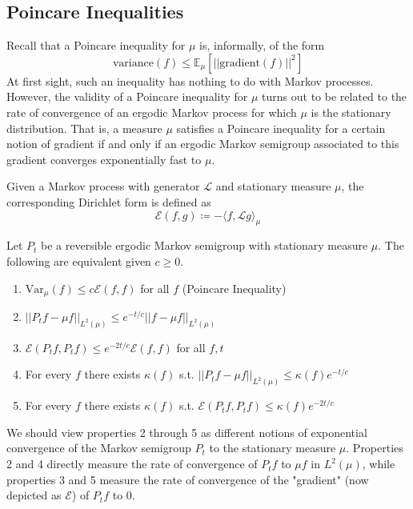 \documentclass{article}
\begin{document}
  \subsection{Poincare Inequalities}

  Recall that a Poincare inequality for $\mu$ is, informally, of the form 
  \[\mathrm{variance}(f) \leq \mathbb{E}_\mu[ ||\mathrm{gradient}(f)||^2 ]\]
  At first sight, such an inequality has nothing to do with Markov processes. However, the validity of a Poincare inequality for $\mu$ turns out to be related to the rate of convergence of an ergodic Markov process for which $\mu$ is the stationary distribution. That is, a measure $\mu$ satisfies a Poincare inequality for a certain notion of gradient if and only if an ergodic Markov semigroup associated to this gradient converges exponentially fast to $\mu$. 

  \begin{definition}
  Given a Markov process with generator $\mathscr{L}$ and stationary measure $\mu$, the corresponding Dirichlet form is defined as 
  \[\mathcal{E}(f, g) \coloneqq - \langle f, \mathscr{L} g \rangle_\mu\]
  \end{definition}

  \begin{theorem}
  Let $P_t$ be a reversible ergodic Markov semigroup with stationary measure $\mu$. The following are equivalent given $c \geq 0$. 
  \begin{enumerate}
      \item $\mathrm{Var}_\mu (f) \leq c \mathcal{E}(f, f)$ for all $f$ (Poincare Inequality) 
      \item $||P_t f - \mu f||_{L^2 (\mu)} \leq e^{-t /c} ||f - \mu f||_{L^2 (\mu)}$
      \item $\mathcal{E}(P_t f, P_t f) \leq e^{-2t /c} \mathcal{E}(f, f)$ for all $f, t$
      \item For every $f$ there exists $\kappa (f)$ s.t. $||P_t f - \mu f||_{L^2 (\mu)} \leq \kappa(f) e^{-t/c}$
      \item For every $f$ there exists $\kappa (f)$ s.t. $\mathcal{E}(P_t f, P_t f) \leq \kappa(f) e^{-2t/c}$ 
  \end{enumerate}
  \end{theorem}

  We should view properties 2 through 5 as different notions of exponential convergence of the Markov semigroup $P_t$ to the stationary measure $\mu$. Properties 2 and 4 directly measure the rate of convergence of $P_t f$ to $\mu f$ in $L^2 (\mu)$, while properties 3 and 5 measure the rate of convergence of the "gradient" (now depicted as $\mathcal{E}$) of $P_t f$ to $0$. 
\end{document}

